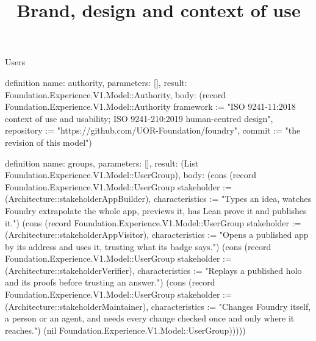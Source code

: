 \begin{lexlean}{Users}
\title{Brand, design and context of use}
\begin{semanticmodule}
definition{
  name: authority,
  parameters: [],
  result: Foundation.Experience.V1.Model::Authority,
  body: (record Foundation.Experience.V1.Model::Authority {framework := "ISO 9241-11:2018 context of use and usability; ISO 9241-210:2019 human-centred design", repository := "https://github.com/UOR-Foundation/foundry", commit := "the revision of this model"})
}

definition{
  name: groups,
  parameters: [],
  result: (List Foundation.Experience.V1.Model::UserGroup),
  body: (cons (record Foundation.Experience.V1.Model::UserGroup {stakeholder := (Architecture::stakeholderAppBuilder), characteristics := "Types an idea, watches Foundry extrapolate the whole app, previews it, has Lean prove it and publishes it."}) (cons (record Foundation.Experience.V1.Model::UserGroup {stakeholder := (Architecture::stakeholderAppVisitor), characteristics := "Opens a published app by its address and uses it, trusting what its badge says."}) (cons (record Foundation.Experience.V1.Model::UserGroup {stakeholder := (Architecture::stakeholderVerifier), characteristics := "Replays a published holo and its proofs before trusting an answer."}) (cons (record Foundation.Experience.V1.Model::UserGroup {stakeholder := (Architecture::stakeholderMaintainer), characteristics := "Changes Foundry itself, a person or an agent, and needs every change checked once and only where it reaches."}) (nil Foundation.Experience.V1.Model::UserGroup)))))
}


\end{semanticmodule}
\end{lexlean}
